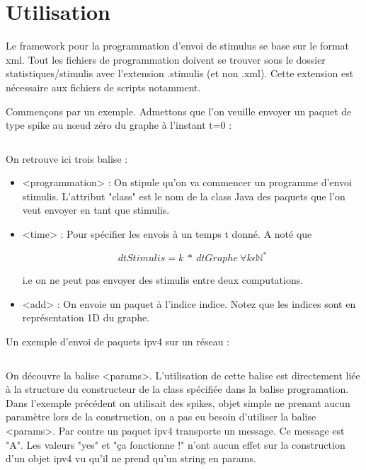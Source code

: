 \documentclass{report}
\begin{document}
\section{Utilisation}

Le framework pour la programmation d'envoi de stimulus se base sur le format xml. Tout les fichiers de programmation doivent se trouver sous le dossier statistiques/stimulis avec l'extension .stimulis (et non .xml). Cette extension est nécessaire aux fichiers de scripts notamment.

Commençons par un exemple. Admettons que l'on veuille envoyer un paquet de type spike au nœud zéro du graphe à l'instant t=0 :
\\
\inputminted[linenos=true,frame=single,label=asend.stimulis]{xml}{/home/nikolai/Work/Loria2014/dnfsim2/statistiques/stimulis/a_send.stimulis}

On retrouve ici trois balise :
\\
\begin{itemize}
\item <programmation> : On stipule qu'on va commencer un programme d'envoi stimulis. L'attribut "class" est le nom de la class Java des paquets que l'on veut envoyer en tant que stimulis.
\item <time> : Pour spécifier les envois à un temps t donné. A noté que 

\[dtStimulis = k\ *\ dtGraphe\ \forall{k \epsilon{\mathbb{N}^*}}   \] 

i.e on ne peut pas envoyer des stimulis entre deux computations.
\item <add> : On envoie un paquet à l'indice indice. Notez que les indices sont en représentation 1D du graphe.
\end{itemize}

Un exemple d'envoi de paquets ipv4 sur un réseau :\\

\inputminted[linenos=true,frame=single,label=ipv4.stimulis]{xml}{/home/nikolai/Work/Loria2014/dnfsim2/statistiques/stimulis/ipv4.stimulis}

On découvre la balise <params>. L'utilisation de cette balise est directement liée à la structure du constructeur de la class spécifiée dans la balise programation. Dans l'exemple précédent on utilisait des spikes, objet simple ne prenant aucun paramètre lors de la construction, on a pas eu besoin d'utiliser la balise <params>. Par contre un paquet ipv4 transporte un message. Ce message est "A". Les valeurs "yes" et "ça fonctionne !" n'ont aucun effet sur la construction d'un objet ipv4 vu qu'il ne prend qu'un string en params.\\
\end{document}
